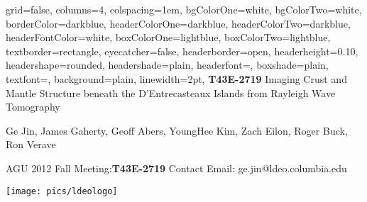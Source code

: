\documentclass[paperwidth=65in,paperheight=43in,landscape,final,fontscale=0.30]{baposter}
\begin{document}
\begin{poster}{
  grid=false,
  columns=4,
  colspacing=1em,
  bgColorOne=white,
  bgColorTwo=white,
  borderColor=darkblue,
  headerColorOne=darkblue,
  headerColorTwo=darkblue,
  headerFontColor=white,
  boxColorOne=lightblue,
  boxColorTwo=lightblue,
  textborder=rectangle,
  eyecatcher=false,
  headerborder=open,
  headerheight=0.10\textheight,  %
  headershape=rounded,
  headershade=plain,
  headerfont=\LARGE\textsf, %
  boxshade=plain,
  textfont={\setlength{\parindent}{1.2em}},
  background=plain,
  linewidth=2pt,
  }
  {} %
  {\sf %
  \vspace{1.0em}
  \textbf{T43E-2719} \hspace{0.1em}
 Imaging Crust and Mantle Structure beneath the D'Entrecasteaux Islands from Rayleigh Wave Tomography
 }
  {\sf %
  \vspace{-3.0ex}
  \begin{multicols}{2}

	  {\LARGE Ge Jin, James Gaherty, Geoff Abers, YoungHee Kim, Zach Eilon, Roger Buck, Ron Verave}

  {\large AGU 2012 Fall Meeting:\textbf{T43E-2719} Contact Email: ge.jin@ldeo.columbia.edu}

	\columnbreak
	\begin{flushright}
		\texttt{[image: pics/ldeologo]}
	\end{flushright}


\end{multicols}}
\end{poster}
\end{document}

